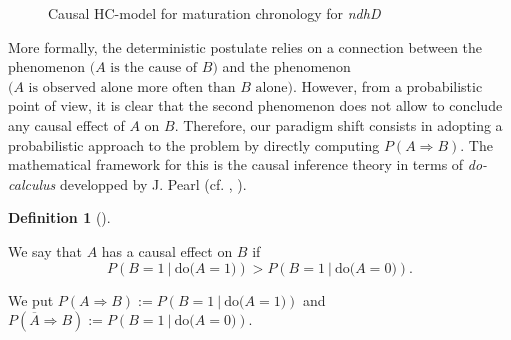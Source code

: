 \documentclass[
]{article}
\theoremstyle{definition}
\newtheorem{definition}{Definition}[section]
\theoremstyle{remark}
\begin{document}
\begin{figure}[H]


\caption{\label{fig-causal_HCmodel_chron_ndhD}Causal HC-model for
maturation chronology for \emph{ndhD}}

\end{figure}%

More formally, the deterministic postulate relies on a connection
between the phenomenon \(\Big(\text{$A$ is the cause of $B$}\Big)\) and
the phenomenon
\(\Big(\text{$A$ is observed alone more often than $B$ alone}\Big)\).
However, from a probabilistic point of view, it is clear that the second
phenomenon does not allow to conclude any causal effect of \(A\) on
\(B\). Therefore, our paradigm shift consists in adopting a
probabilistic approach to the problem by directly computing
\(P(A\Rightarrow B)\). The mathematical framework for this is the causal
inference theory in terms of \emph{do-calculus} developped by J. Pearl
(cf. ,
).

\begin{definition}[]\protect\hypertarget{def-CausalEffect}{}\label{def-CausalEffect}

We say that \(A\) has a causal effect on \(B\) if
\[P(B=1\ |\ \text{do($A=1$)}) > P(B=1\ |\ \text{do($A=0$)}).\]

We put \(P(A\Rightarrow B):= P(B=1\ |\ \text{do($A=1$)})\) and
\(P(\overline{A}\Rightarrow B):= P(B=1\ |\ \text{do($A=0$)})\).

\end{definition}
\end{document}
